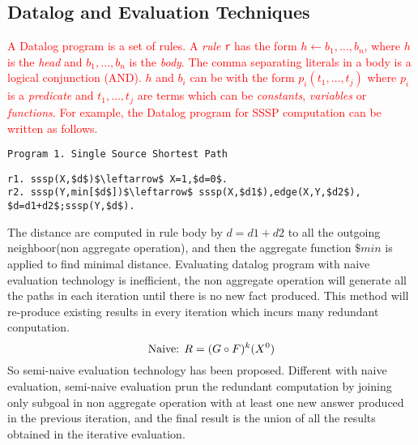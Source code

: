 
\subsection{Datalog and Evaluation Techniques}

\textcolor{red}{A Datalog program is a set of rules. A \emph{rule} \texttt{r} has the form $h\leftarrow b_1,\ldots,b_n$, where $h$ is the \emph{head} and $b_1,\ldots,b_n$ is the \emph{body}. The comma separating literals in a body is a logical conjunction (AND). $h$ and $b_i$ can be with the form $p_i(t_1,\ldots,t_j)$ where $p_i$ is a \emph{predicate} and $t_1,\ldots,t_j$ are terms which can be \emph{constants}, \emph{variables} or \emph{functions}. For example, the Datalog program for SSSP computation can be written as follows.}
\begin{verbatim}
Program 1. Single Source Shortest Path
\end{verbatim}
\vspace{-0.1in}
\small
\begin{lstlisting}
r1. sssp(X,$d$)$\leftarrow$ X=1,$d=0$.
r2. sssp(Y,min[$d$])$\leftarrow$ sssp(X,$d1$),edge(X,Y,$d2$),
$d=d1+d2$;sssp(Y,$d$).
\end{lstlisting}
\normalsize
The distance are computed in rule body by $d=d1+d2$ to all the outgoing neighboor(non aggregate operation), and then the aggregate function $\$min$ is applied to find minimal distance. Evaluating datalog program with naive evaluation technology is inefficient, the non aggregate operation will generate all the paths in each iteration until there is no new fact produced. This method will re-produce existing results in every iteration which incurs many redundant conputation.
	\begin{equation}
\label{eq:naive}
\text{Naive:  }	R=(G\circ F)^k(X^0)\notag
\end{equation}
So semi-naive evaluation technology has been proposed. Different with naive evaluation, semi-naive evaluation prun the redundant computation by joining only subgoal in non aggregate operation with at least one new answer produced in the previous iteration, and the final result is the union of all the results obtained in the iterative evaluation.



